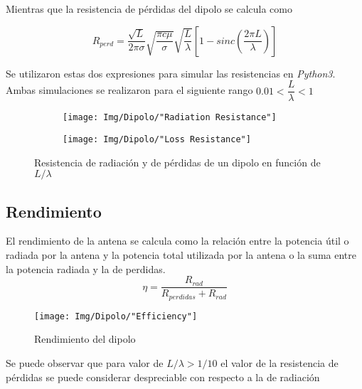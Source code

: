\documentclass{article}
\begin{document}
Mientras que la resistencia de pérdidas del dipolo se calcula como

\begin{equation}
    R_{perd} = \dfrac{\sqrt{L}}{2\pi \sigma} 
                \sqrt{\frac{\pi c \mu }{\sigma}} 
                \sqrt{\dfrac{L}{\lambda}} 
                \left[ 1 - sinc\left( \dfrac{2\pi L}{\lambda} \right) \right]
\end{equation}

Se utilizaron estas dos expresiones para simular las resistencias en \textit{Python3}. Ambas simulaciones se realizaron para el siguiente rango $ 0.01 < \dfrac{L}{\lambda} < 1 $

\begin{figure}[H]

    \begin{subfigure}{0.6\textwidth}
        \centering
        \texttt{[image: Img/Dipolo/"Radiation Resistance"]}
        \label{fig:dipolo_res_rad}
    \end{subfigure}
    \begin{subfigure}{0.6\textwidth}
        \centering
        \texttt{[image: Img/Dipolo/"Loss Resistance"]}
        \label{fig:dipolo_loss_res}
    \end{subfigure}
    \caption{Resistencia de radiación y de pérdidas de un dipolo en función de $L/\lambda$}
\end{figure}

\subsection{Rendimiento}

El rendimiento de la antena se calcula como la relación entre la potencia útil o radiada por la antena y la potencia total utilizada por la antena o la suma entre la potencia radiada y la de perdidas.
\begin{equation}
    \eta = \dfrac{R_{rad}}{R_{perdidas} + R_{rad}}
\end{equation}

\begin{figure}[H]
	\centering
        \texttt{[image: Img/Dipolo/"Efficiency"]}
        \caption{Rendimiento del dipolo}
        \label{dipolo_rendimiento}
\end{figure}

Se puede observar que para valor de $L/\lambda > 1/10$ el valor de la resistencia de pérdidas se puede considerar despreciable con respecto a la de radiación
\end{document}
